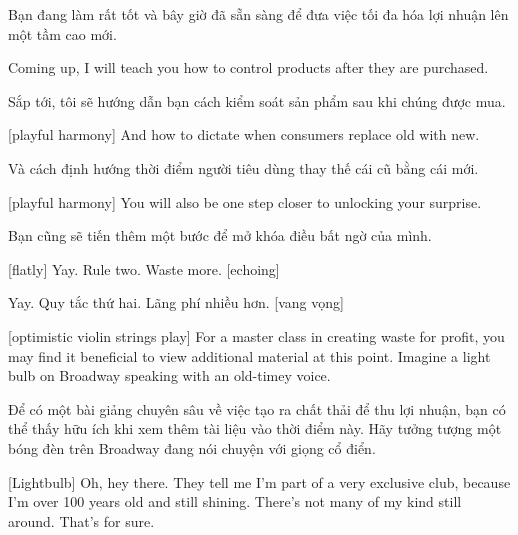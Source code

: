 \documentclass[a4paper]{article}
\begin{document}
	\begin{vietnamese-v2}
		Bạn đang làm rất tốt và bây giờ đã sẵn sàng để đưa việc tối đa hóa lợi nhuận lên một tầm cao mới.
	\end{vietnamese-v2}
	
	Coming up, I will teach you how to control products after they are purchased.
	
	\begin{vietnamese-v2}
		Sắp tới, tôi sẽ hướng dẫn bạn cách kiểm soát sản phẩm sau khi chúng được mua.
	\end{vietnamese-v2}
	
	[playful harmony]
	And how to dictate when consumers replace old with new.
	
	\begin{vietnamese-v2}
		Và cách định hướng thời điểm người tiêu dùng thay thế cái cũ bằng cái mới.
	\end{vietnamese-v2}
	
	[playful harmony]
	You will also be one step closer to unlocking your surprise.
	
	\begin{vietnamese-v2}
		Bạn cũng sẽ tiến thêm một bước để mở khóa điều bất ngờ của mình.
	\end{vietnamese-v2}
	
	
	[flatly] Yay.
	Rule two.
	Waste more. [echoing]
	
	\begin{vietnamese-v2}
		 Yay. 
		Quy tắc thứ hai. 
		Lãng phí nhiều hơn. [vang vọng]
	\end{vietnamese-v2}
	
	[optimistic violin strings play]
	For a master class in creating waste for profit, you may find it beneficial to view additional material at this point.
	Imagine a light bulb on Broadway speaking with an old-timey voice.
	
	\begin{vietnamese-v2}
		Để có một bài giảng chuyên sâu về việc tạo ra chất thải để thu lợi nhuận, bạn có thể thấy hữu ích khi xem thêm tài liệu vào thời điểm này. 
		Hãy tưởng tượng một bóng đèn trên Broadway đang nói chuyện với giọng cổ điển.
	\end{vietnamese-v2}
	
	[Lightbulb] Oh, hey there.
	They tell me I'm part of a very exclusive club, because I'm over 100 years old and still shining.
	There's not many of my kind still around. That's for sure.
	
\end{document}
